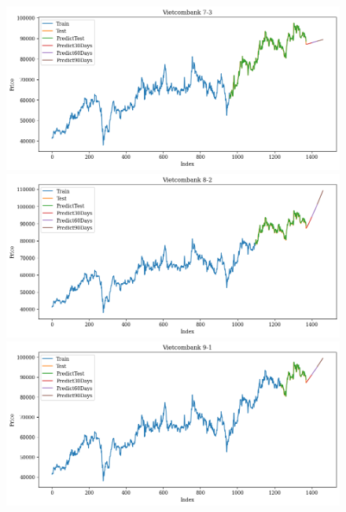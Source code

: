 \begin{figure}[H]
\begin{minipage}{0.15\textwidth}
    \end{minipage}
    \hfill
    \begin{minipage}{0.15\textwidth}
    \centering
    \includegraphics[width=1\textwidth]{resources/chapter-5/newdata1/result/VCB_N-HiTS_7-3.png}
    \end{minipage}
    \hfill
    \begin{minipage}{0.15\textwidth}
    \centering
    \includegraphics[width=1\textwidth]{resources/chapter-5/newdata1/result/VCB_N-HiTS_8-2.png}
    \end{minipage}
    \hfill
        \begin{minipage}{0.15\textwidth}
    \centering
    \includegraphics[width=1\textwidth]{resources/chapter-5/newdata1/result/VCB_N-HiTS_9-1.png}

\end{minipage}
\end{figure}
